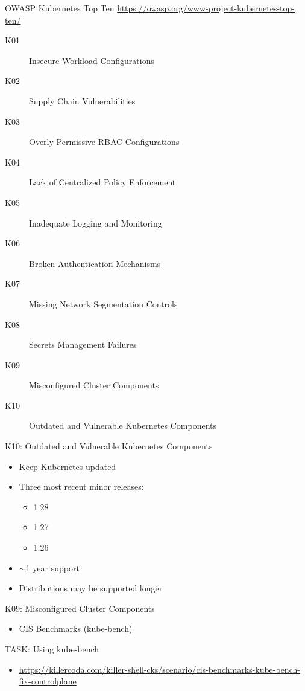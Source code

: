\documentclass{dcpresentation}
\begin{document}
\begin{frame}{OWASP Kubernetes Top Ten}
  {\url{https://owasp.org/www-project-kubernetes-top-ten/}}
  \begin{description}
  \item[K01] Insecure Workload Configurations
  \item[K02] Supply Chain Vulnerabilities
  \item[K03] Overly Permissive RBAC Configurations
  \item[K04] Lack of Centralized Policy Enforcement
  \item[K05] Inadequate Logging and Monitoring
  \item[K06] Broken Authentication Mechanisms
  \item[K07] Missing Network Segmentation Controls
  \item[K08] Secrets Management Failures
  \item[K09] Misconfigured Cluster Components
  \item[K10] Outdated and Vulnerable Kubernetes Components
  \end{description}
\end{frame}

\begin{frame}{K10: Outdated and Vulnerable Kubernetes Components}
  \begin{itemize}
  \item Keep Kubernetes updated
  \item Three most recent minor releases:
    \begin{itemize}
    \item 1.28
    \item 1.27
    \item 1.26
    \end{itemize}
  \item $\sim$1 year support
  \item Distributions may be supported longer
  \end{itemize}
\end{frame}

\begin{frame}{K09: Misconfigured Cluster Components}
  \begin{itemize}
  \item CIS Benchmarks (kube-bench)
  \end{itemize}
\end{frame}

\begin{frame}{TASK: Using kube-bench}
 \begin{itemize}
  \item \url{https://killercoda.com/killer-shell-cks/scenario/cis-benchmarks-kube-bench-fix-controlplane}
 \end{itemize}
\end{frame}
\end{document}
